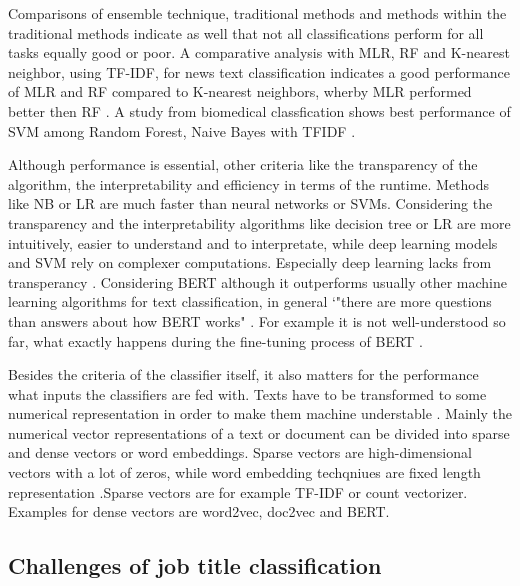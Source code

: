\documentclass[12pt, a4paper, titlepage]{article}
\begin{document}
Comparisons of ensemble technique, traditional methods and methods within the traditional methods indicate as well that not all classifications perform for all tasks equally good or poor. A comparative analysis with \ac{MLR}, \ac{RF} and K-nearest neighbor, using \ac{TF-IDF}, for news text classification indicates a good performance of \ac{MLR} and \ac{RF} compared to K-nearest neighbors, wherby \ac{MLR} performed better then \ac{RF} \citep{shah2020}. A study from biomedical classfication shows best performance of SVM among Random Forest, Naive Bayes with TFIDF \citep{danso2014}. 

Although performance is essential, other criteria like the transparency of the algorithm, the interpretability and efficiency in terms of the runtime. Methods like \ac{NB} or \ac{LR} are much faster than neural networks or \ac{SVM}s. Considering the transparency and the interpretability algorithms like decision tree or \ac{LR} are more intuitively, easier to understand and to interpretate, while deep learning models and \ac{SVM} rely on complexer computations. Especially deep learning lacks from transperancy \citep{maglogiannis2007}. Considering \ac{BERT} although it outperforms usually other machine learning algorithms for text classification, in general `"there are more questions than answers about how BERT works" \citep[853]{rogers2020}. For example it is not well-understood so far, what exactly happens during the fine-tuning process of \ac{BERT} \citep{merchant2020}. 

Besides the criteria of the classifier itself, it also matters for the performance what inputs the classifiers are fed with. Texts have to be transformed to some numerical representation in order to make them machine understable \citep{singh2019}. Mainly the numerical vector representations of a text or document can be divided into sparse and dense vectors or word embeddings. Sparse vectors are high-dimensional vectors with a lot of zeros, while word embedding techqniues are fixed length representation \citep{almeida2019}.Sparse vectors are for example \ac{TF-IDF} or count vectorizer. Examples for dense vectors are word2vec, doc2vec and \ac{BERT}.   
 
\subsection{Challenges of job title classification}
\end{document}
